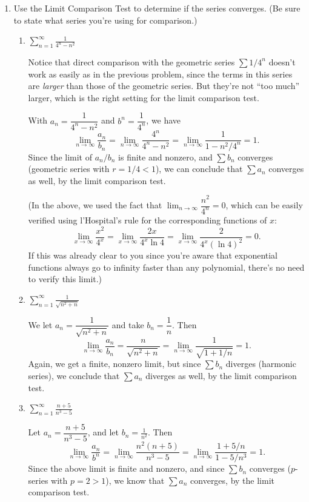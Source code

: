 \documentclass[12pt]{article}
\newcommand{\di}{\displaystyle}
\begin{document}
\begin{enumerate}
\begin{enumerate}
\end{enumerate}

\item Use the Limit Comparison Test to determine if the series converges. (Be sure to state what series you're using for comparison.)

 \begin{enumerate}
  \item $\di \sum_{n=1}^\infty \frac{1}{4^n-n^2}$

\bigskip

Notice that direct comparison with the geometric series $\sum 1/4^n$ doesn't work as easily as in the previous problem, since the terms in this series are \textit{larger} than those of the geometric series. But they're not ``too much'' larger, which is the right setting for the limit comparison test.

With $a_n = \dfrac{1}{4^n-n^2}$ and $b^n = \dfrac{1}{4^n}$, we have
\[
\lim_{n\to\infty}\frac{a_n}{b_n} = \lim_{n\to\infty}\frac{4^n}{4^n-n^2} = \lim_{n\to\infty}\frac{1}{1-n^2/4^n} = 1.
\]
Since the limit of $a_n/b_n$ is finite and nonzero, and $\sum b_n$ converges (geometric series with $r=1/4<1$), we can conclude that $\sum a_n$ converges as well, by the limit comparison test.

(In the above, we used the fact that $\lim_{n\to \infty}\dfrac{n^2}{4^n}=0$, which can be easily verified using l'Hospital's rule for the corresponding functions of $x$:
\[
\lim_{x\to\infty}\frac{x^2}{4^x} = \lim_{x\to \infty}\frac{2x}{4^x\ln 4} = \lim_{x\to\infty}\frac{2}{4^x(\ln 4)^2} = 0.
\]
If this was already clear to you since you're aware that exponential functions always go to infinity faster than any polynomial, there's no need to verify this limit.)
  \item $\di \sum_{n=1}^\infty \frac{1}{\sqrt{n^2+n}}$
  
  \bigskip
  
  We let $a_n = \dfrac{1}{\sqrt{n^2+n}}$ and take $b_n = \dfrac{1}{n}$. Then
  \[
  \lim_{n\to\infty}\frac{a_n}{b_n} = \frac{n}{\sqrt{n^2+n}} = \lim_{n\to\infty}\frac{1}{\sqrt{1+1/n}}=1.
  \]
  Again, we get a finite, nonzero limit, but since $\sum b_n$ diverges (harmonic series), we conclude that $\sum a_n$ diverges as well, by the limit comparison test.
  
  \item $\di \sum_{n=1}^\infty \frac{n+5}{n^3-5}$

Let $a_n = \dfrac{n+5}{n^3-5}$, and let $b_n=\frac{1}{n^2}$. Then
\[
\lim_{n\to\infty}\frac{a_n}{b^n} = \lim_{n\to\infty}\frac{n^2(n+5)}{n^3-5} = \lim_{n\to\infty}\frac{1+5/n}{1-5/n^3} = 1.
\]
Since the above limit is finite and nonzero, and since $\sum b_n$ converges ($p$-series with $p=2>1$), we know that $\sum a_n$ converges, by the limit comparison test.
 \end{enumerate}



\end{enumerate}
\end{document}
